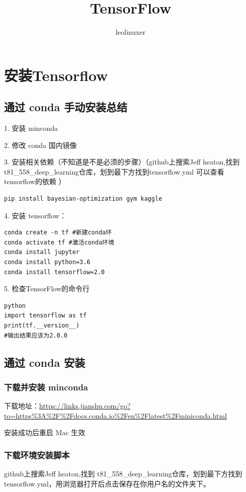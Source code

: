 \documentclass[12pt]{article}
\title{TensorFlow\cite{TensorFlow_Tutorial_From_Zero_1}\cite{TensorFlow_Tutorial_Official}\cite{TensorFlow_Tutorial_Quick_Detailed}}
\author{leolinuxer}
\begin{document}
\maketitle
\tableofcontents

\section{安装Tensorflow}
\subsection{通过 conda 手动安装总结}
1. 安装 minconda

2. 修改 conda 国内镜像

3. 安装相关依赖（不知道是不是必须的步骤）（github上搜索Jeff heaton,找到 t81\_558\_deep\_learning仓库，划到最下方找到tensorflow.yml 可以查看 tensorflow的依赖 ）
\begin{lstlisting}
pip install bayesian-optimization gym kaggle
\end{lstlisting}

4. 安装 tensorflow：
\begin{lstlisting}
conda create -n tf #新建conda环
conda activate tf #激活conda环境
conda install jupyter
conda install python=3.6
conda install tensorflow=2.0
\end{lstlisting}

5. 检查TensorFlow的命令行
\begin{lstlisting}
python
import tensorflow as tf
print(tf.__version__)
#输出结果应该为2.0.0
\end{lstlisting}

\subsection{通过 conda 安装}
\subsubsection{下载并安装 minconda}
下载地址：\url{https://links.jianshu.com/go?to=https%3A%2F%2Fdocs.conda.io%2Fen%2Flatest%2Fminiconda.html}

安装成功后重启 Mac 生效

\subsubsection{下载环境安装脚本}
github上搜索Jeff heaton,找到 t81\_558\_deep\_learning仓库，划到最下方找到tensorflow.yml，用浏览器打开后点击保存在你用户名的文件夹下。
\end{document}
